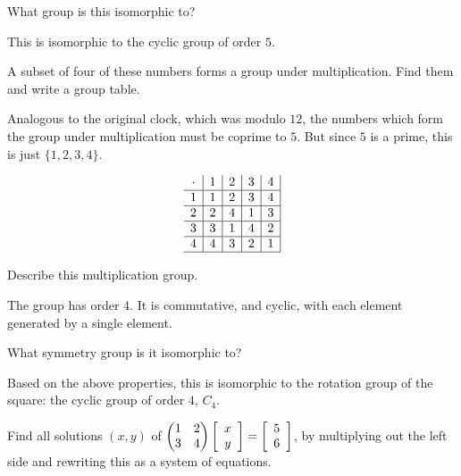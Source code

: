 \documentclass[../gatm_answers.tex]{subfiles}
\begin{document}
\begin{inner_problem}
\item What group is this isomorphic to?
\end{inner_problem}

This is isomorphic to the cyclic group of order $5$.

\begin{inner_problem}
\item A subset of four of these numbers forms a group under multiplication. Find them and write a group table.
\end{inner_problem}

Analogous to the original clock, which was modulo $12$, the numbers which form the group under multiplication must be coprime to $5$. But since $5$ is a prime, this is just $\{1,2,3,4\}$.

$$\begin{array}{c|c|c|c|c|}
\cdot & 1 & 2 & 3 & 4 \\ \hline
1 & 1 & 2 & 3 & 4 \\ \hline
2 & 2 & 4 & 1 & 3 \\ \hline
3 & 3 & 1 & 4 & 2 \\ \hline
4 & 4 & 3 & 2 & 1 \\ \hline
\end{array}$$

\begin{inner_problem}
\item Describe this multiplication group.
\end{inner_problem}

The group has order $4$. It is commutative, and cyclic, with each element generated by a single element.

\begin{inner_problem}
\item What symmetry group is it isomorphic to?
\end{inner_problem}

Based on the above properties, this is isomorphic to the rotation group of the square: the cyclic group of order $4$, $C_4$.

\begin{outer_problem}
\item
\end{outer_problem}

\begin{inner_problem}[start=1]
\item \label{prob:needed_for_matrix_undo3}Find all solutions $(x,y)$ of $\begin{pmatrix} 1 & 2 \\ 3 & 4 \end{pmatrix}\left[\begin{array}{c} x \\ y \end{array}\right]=\left[\begin{array}{c} 5 \\ 6 \end{array}\right]$, by multiplying out the left side and rewriting this as a system of equations.
\end{inner_problem}
\end{document}
